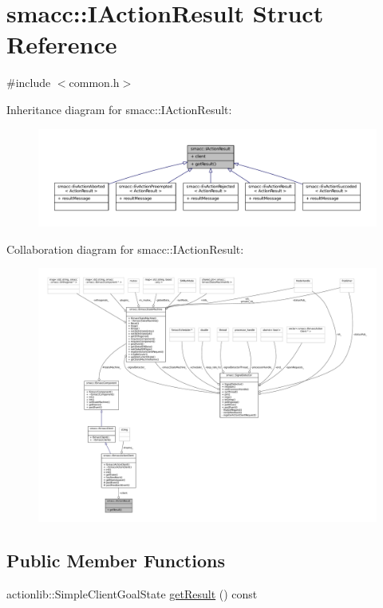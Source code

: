 \hypertarget{structsmacc_1_1IActionResult}{}\section{smacc\+:\+:I\+Action\+Result Struct Reference}
\label{structsmacc_1_1IActionResult}


{\ttfamily \#include $<$common.\+h$>$}



Inheritance diagram for smacc\+:\+:I\+Action\+Result\+:
\nopagebreak
\begin{figure}[H]
\begin{center}
\leavevmode
\includegraphics[width=350pt]{structsmacc_1_1IActionResult__inherit__graph}
\end{center}
\end{figure}


Collaboration diagram for smacc\+:\+:I\+Action\+Result\+:
\nopagebreak
\begin{figure}[H]
\begin{center}
\leavevmode
\includegraphics[width=350pt]{structsmacc_1_1IActionResult__coll__graph}
\end{center}
\end{figure}
\subsection*{Public Member Functions}
\begin{DoxyCompactItemize}
\item 
actionlib\+::\+Simple\+Client\+Goal\+State \hyperlink{structsmacc_1_1IActionResult_a0c127144bfd0a844380533a95f133300}{get\+Result} () const 
\end{DoxyCompactItemize}
